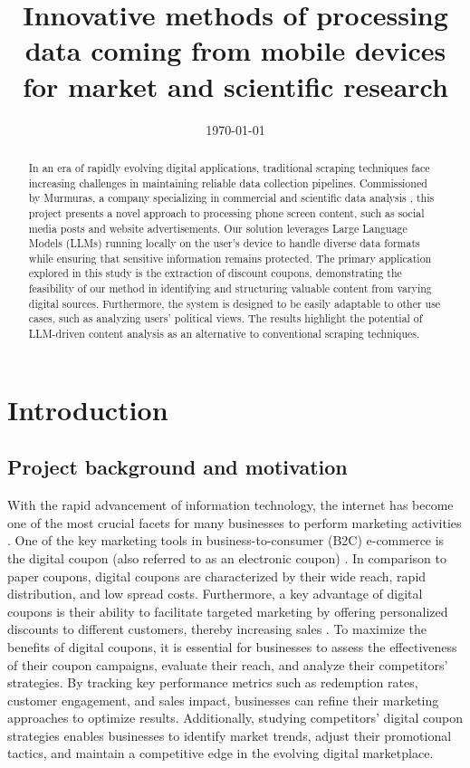 \documentclass[licencjacka,en]{pracamgr}
\title{Innovative methods of processing data coming from mobile devices for market and scientific research}
\date{\today}
\begin{document}
\maketitle

\begin{abstract}
In an era of rapidly evolving digital applications, traditional scraping techniques face increasing challenges in maintaining reliable data collection pipelines. Commissioned by Murmuras, a company specializing in commercial and scientific data analysis \cite{murmuras}, this project presents a novel approach to processing phone screen content, such as social media posts and website advertisements. Our solution leverages Large Language Models (LLMs) running locally on the user's device to handle diverse data formats while ensuring that sensitive information remains protected. The primary application explored in this study is the extraction of discount coupons, demonstrating the feasibility of our method in identifying and structuring valuable content from varying digital sources. Furthermore, the system is designed to be easily adaptable to other use cases, such as analyzing users' political views. The results highlight the potential of LLM-driven content analysis as an alternative to conventional scraping techniques.
\raggedright
\end{abstract}

\tableofcontents

\chapter{Introduction}
\section{Project background and motivation}
With the rapid advancement of information technology, the internet has become one of the most crucial facets for many businesses to perform marketing activities \cite{design_of_coupons}. One of the key marketing tools in business-to-consumer (B2C) e-commerce is the digital coupon (also referred to as an electronic coupon) \cite{targeted_reminders}. In comparison to paper coupons, digital coupons are characterized by their wide reach, rapid distribution, and low spread costs. Furthermore, a key advantage of digital coupons is their ability to facilitate targeted marketing by offering personalized discounts to different customers, thereby increasing sales \cite{design_of_coupons}. To maximize the benefits of digital coupons, it is essential for businesses to assess the effectiveness of their coupon campaigns, evaluate their reach, and analyze their competitors’ strategies. By tracking key performance metrics such as redemption rates, customer engagement, and sales impact, businesses can refine their marketing approaches to optimize results. Additionally, studying competitors' digital coupon strategies enables businesses to identify market trends, adjust their promotional tactics, and maintain a competitive edge in the evolving digital marketplace. 
\end{document}
